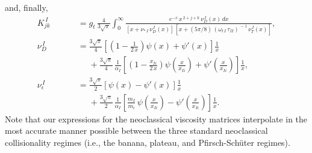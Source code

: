 \documentclass[notitlepage,12pt]{article}
\begin{document}
and, finally, 
\begin{align}
 K_{jk}^{\,I} &= g_t\,\frac{4}{3\sqrt{\pi}}\int_0^\infty
\frac{e^{-x}\,x^{\,2+j+k}\,\nu_D^{\,I}(x)\,dx}{[x+\nu_{\ast\,I}\,\nu_D^{\,I}(x)]\,[x+(5\pi/8)\,(\omega_{t\,I}\,\tau_{II})^{\,-1}\,\nu_T^{\,I}(x)]},\\[0.5ex]
 \nu_D^{\,I}&= \frac{3\sqrt{\pi}}{4}\left[\left(1-\frac{1}{2\,x}\right)\psi(x)+\psi'(x)\right]\frac{1}{x}\nonumber\\[0.5ex]\phantom{===}
&\phantom{=}+\frac{3\sqrt{\pi}}{4}\,\frac{1}{\alpha_I}\left[\left(1-\frac{x_{Ii}}{2\,x}\right)\psi\!\left(\frac{x}{x_{Ii}}\right)
+\psi'\!\left(\frac{x}{x_{Ii}}\right)\right]\frac{1}{x},\\[0.5ex]
 \nu_\epsilon^{\,I}&= \frac{3\sqrt{\pi}}{2}\left[\psi(x)-\psi'(x)\right]\frac{1}{x}\nonumber\\[0.5ex]\phantom{===}
&\phantom{=}+\frac{3\sqrt{\pi}}{2}\,\frac{1}{\alpha_I}\left[\frac{m_I}{m_i}\,\psi\!\left(\frac{x}{x_{Ii}}\right)
-\psi'\!\left(\frac{x}{x_{Ii}}\right)\right]\frac{1}{x}.
\end{align}
Note that our expressions for the neoclassical viscosity
matrices interpolate in the most accurate manner possible
between the three standard neoclassical collisionality
regimes (i.e., the banana, plateau, and Pfirsch-Sch\"{u}ter
regimes).
\end{document}
